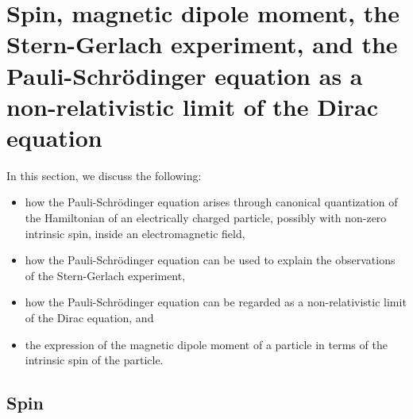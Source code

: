 

\chapter{Spin, magnetic dipole moment, the Stern-Gerlach experiment, and
the Pauli-Schr\"{o}dinger equation as a non-relativistic limit of the Dirac equation}
\setcounter{theorem}{0}
\setcounter{equation}{0}


\renewcommand{\theenumi}{\roman{enumi}}
\renewcommand{\labelenumi}{\textnormal{(\theenumi)}$\;\;$}


In this section, we discuss the following:
\begin{itemize}
\item
    how the Pauli-Schrödinger equation arises through canonical quantization
    of the Hamiltonian of an electrically charged particle,
    possibly with non-zero intrinsic spin, inside an electromagnetic field, 
\item
    how the Pauli-Schrödinger equation can be used to explain the observations
    of the Stern-Gerlach experiment,
\item
    how the Pauli-Schrödinger equation can be regarded as a non-relativistic limit
    of the Dirac equation, and
\item
    the expression of the magnetic dipole moment of a particle
    in terms of the intrinsic spin of the particle.
\end{itemize}


\vskip 0.5cm
\section{Spin}





